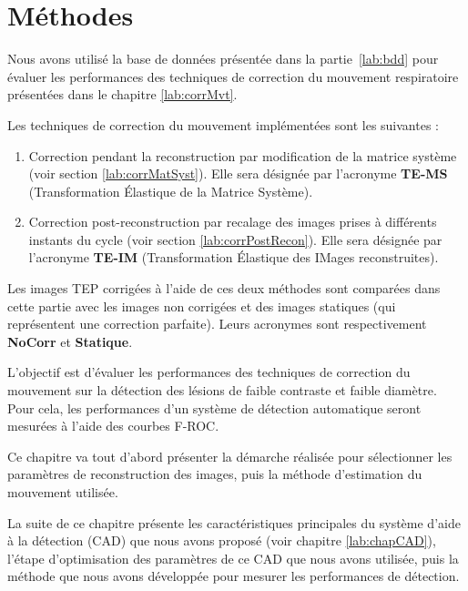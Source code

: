 \chapter{Méthodes}

Nous avons utilisé la base de données présentée dans la partie~\ref{lab:bdd} pour évaluer les performances des techniques de correction du mouvement respiratoire présentées dans le chapitre \ref{lab:corrMvt}. 

Les techniques de correction du mouvement implémentées sont les suivantes :

\begin{enumerate}
 \item Correction pendant la reconstruction par modification de la matrice système (voir section \ref{lab:corrMatSyst}). Elle sera désignée par l'acronyme \textbf{TE-MS} (Transformation \'Elastique de la Matrice Système).
 \item Correction post-reconstruction par recalage des images prises à différents instants du cycle (voir section \ref{lab:corrPostRecon}). Elle sera désignée par l'acronyme \textbf{TE-IM} (Transformation \'Elastique des IMages reconstruites).
\end{enumerate}

Les images TEP corrigées à l'aide de ces deux méthodes sont comparées dans cette partie avec les images non corrigées et des images statiques (qui représentent une correction parfaite). Leurs acronymes sont respectivement \textbf{NoCorr} et \textbf{Statique}.

L'objectif est d'évaluer les performances des techniques de correction du mouvement sur la détection des lésions de faible contraste et faible diamètre. Pour cela, les performances d'un système de détection automatique seront mesurées à l'aide des courbes F-ROC.

Ce chapitre va tout d'abord présenter la démarche réalisée pour sélectionner les paramètres de reconstruction des images, puis la méthode d'estimation du mouvement utilisée. 

La suite de ce chapitre présente les caractéristiques principales du système d'aide à la détection (CAD) que nous avons proposé (voir chapitre \ref{lab:chapCAD}), l'étape d'optimisation des paramètres de ce CAD que nous avons utilisée, puis la méthode que nous avons développée pour mesurer les performances de détection.




